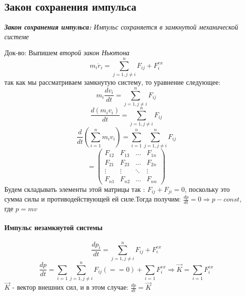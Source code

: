 \documentclass[12pt,a4paper]{report}
\begin{document}
\subsection{Закон сохранения импульса}

\textit{\textbf{Закон сохранения импульса:} Импульс сохраняется в замкнутой механической системе}

Док-во: Выпишем \textit{второй закон Ньютона}
\[m_i \ddot r_i = \sum_{j=1, j \neq i }^n F_{ij} + F_i^{ex}\]
так как мы рассматриваем замкнутую систему, то уравнение следующее:
\[ m_i\frac{dv_i}{dt} = \sum_{j=1, j \neq i }^n F_{ij}\]
\[\frac{d(m_iv_i)}{dt} = \sum_{j=1, j \neq i }^n F_{ij}\]
\[\frac{d}{dt}(\sum_{i = 1}^n m_i v_i) = \sum_{i = 1}^n \sum_{j=1, j \neq i }^n F_{ij}\]
\begin{equation*}
    = \left(
    \begin{array}{cccc}
        F_{12} & F_{13} & \ldots & F_{1n} \\
        F_{21} & F_{23} & \ldots & F_{2n} \\
        \vdots & \vdots & \ddots & \vdots \\
        F_{n1} & F_{n2} & \ldots & F_{nn}
    \end{array}
    \right)
\end{equation*}
Будем складывать элементы этой матрицы так : $F_{ij}+ F_{ji} = 0$, поскольку это сумма силы и противодействующей ей силе.Тогда получим: $\frac{dp}{dt} = 0 \Rightarrow p - const$, где $ p = mv$


\paragraph{Импульс незамкнутой системы}
\[ \frac{dp_i}{dt} = \sum_{j=1, j \neq i }^n F_{ij} + F_i^{ex}\]
\[ \frac{dp}{dt} = \sum_{i = 1}\sum_{j=1, j \neq i }^n F_{ij} (== 0) + \sum_{i=1} F_i^{ex} \Rightarrow \vec K = \sum_{i=1} F_i^{ex}\]
$\vec K$ - вектор внешних сил, и в этом случае: $ \frac{dp}{dt} = \vec K$
\end{document}
